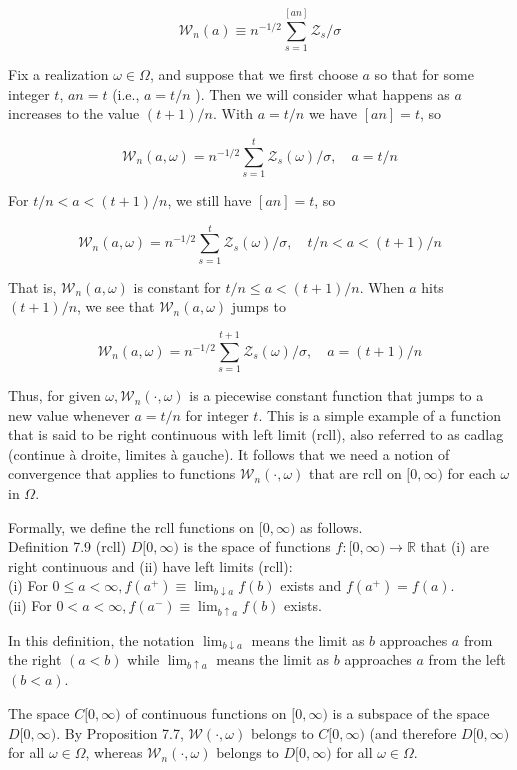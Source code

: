 \documentclass[10pt]{article}
\begin{document}
$$
\mathcal{W}_{n}(a) \equiv n^{-1 / 2} \sum_{s=1}^{[a n]} \mathcal{Z}_{s} / \sigma
$$

Fix a realization $\omega \in \Omega$, and suppose that we first choose $a$ so that for some integer $t$, $a n=t$ (i.e., $a=t / n$ ). Then we will consider what happens as $a$ increases to the value $(t+1) / n$. With $a=t / n$ we have $[a n]=t$, so

$$
\mathcal{W}_{n}(a, \omega)=n^{-1 / 2} \sum_{s=1}^{t} \mathcal{Z}_{s}(\omega) / \sigma, \quad a=t / n
$$

For $t / n<a<(t+1) / n$, we still have $[a n]=t$, so

$$
\mathcal{W}_{n}(a, \omega)=n^{-1 / 2} \sum_{s=1}^{t} \mathcal{Z}_{s}(\omega) / \sigma, \quad t / n<a<(t+1) / n
$$

That is, $\mathcal{W}_{n}(a, \omega)$ is constant for $t / n \leq a<(t+1) / n$. When $a$ hits $(t+1) / n$, we see that $\mathcal{W}_{n}(a, \omega)$ jumps to

$$
\mathcal{W}_{n}(a, \omega)=n^{-1 / 2} \sum_{s=1}^{t+1} \mathcal{Z}_{s}(\omega) / \sigma, \quad a=(t+1) / n
$$

Thus, for given $\omega, \mathcal{W}_{n}(\cdot, \omega)$ is a piecewise constant function that jumps to a new value whenever $a=t / n$ for integer $t$. This is a simple example of a function that is said to be right continuous with left limit (rcll), also referred to as cadlag (continue à droite, limites à gauche). It follows that we need a notion of convergence that applies to functions $\mathcal{W}_{n}(\cdot, \omega)$ that are rcll on $[0, \infty)$ for each $\omega$ in $\Omega$.

Formally, we define the rcll functions on $[0, \infty)$ as follows.\\
Definition 7.9 (rcll) $D[0, \infty)$ is the space of functions $f:[0, \infty) \rightarrow \mathbb{R}$ that (i) are right continuous and (ii) have left limits (rcll):\\
(i) For $0 \leq a<\infty, f\left(a^{+}\right) \equiv \lim _{b \downarrow a} f(b)$ exists and $f\left(a^{+}\right)=f(a)$.\\
(ii) For $0<a<\infty, f\left(a^{-}\right) \equiv \lim _{b \uparrow a} f(b)$ exists.

In this definition, the notation $\lim _{b \downarrow a}$ means the limit as $b$ approaches $a$ from the right $(a<b)$ while $\lim _{b \uparrow a}$ means the limit as $b$ approaches $a$ from the left $(b<a)$.

The space $C[0, \infty)$ of continuous functions on $[0, \infty)$ is a subspace of the space $D[0, \infty)$. By Proposition 7.7, $\mathcal{W}(\cdot, \omega)$ belongs to $C[0, \infty)$ (and therefore $D[0, \infty)$ for all $\omega \in \Omega$, whereas $\mathcal{W}_{n}(\cdot, \omega)$ belongs to $D[0, \infty)$ for all $\omega \in \Omega$.
\end{document}
